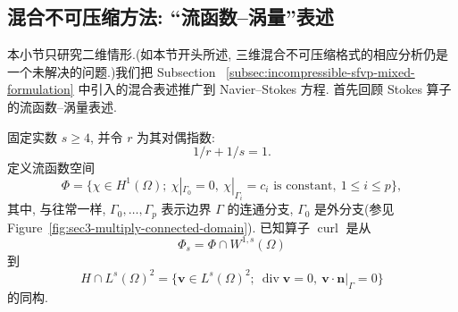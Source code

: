 \subsection{混合不可压缩方法: ``流函数--涡量''表述}
\label{subsec:navier-centered-stream-vorticity}

本小节只研究二维情形.(如本节开头所述, 三维混合不可压缩格式的相应分析仍是
一个未解决的问题.)我们把 Subsection~
\ref{subsec:incompressible-sfvp-mixed-formulation} 中引入的混合表述推广到
Navier--Stokes 方程. 首先回顾 Stokes 算子的流函数--涡量表述.

固定实数 $s\geq4$, 并令 $r$ 为其对偶指数:
\[
1/r+1/s=1.
\]
定义流函数空间
\[
\Phi=\{\chi\in H^1(\Omega);
\ \chi|_{\Gamma_0}=0,
\ \chi|_{\Gamma_i}=c_i\text{ is constant},
\ 1\leq i\leq p\},
\]
其中, 与往常一样, $\Gamma_0,\ldots,\Gamma_p$ 表示边界 $\Gamma$ 的连通分支,
$\Gamma_0$ 是外分支(参见 Figure~\ref{fig:sec3-multiply-connected-domain}).
已知算子 $\operatorname{curl}$ 是从
\begin{equation}\label{eq:navier-centered-stream-space}
\Phi_s=\Phi\cap W^{1,s}(\Omega)
\end{equation}
到
\[
H\cap L^s(\Omega)^2
=\{\boldsymbol v\in L^s(\Omega)^2;
\ \operatorname{div}\boldsymbol v=0,
\ \boldsymbol v\cdot\boldsymbol n|_\Gamma=0\}
\]
的同构.
